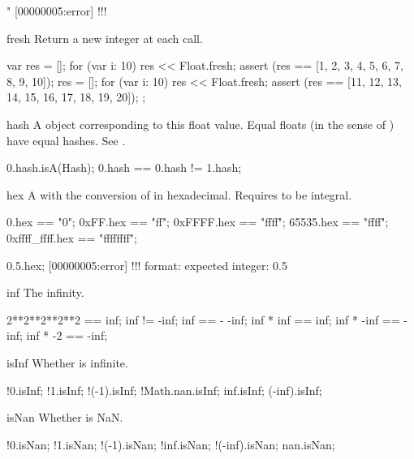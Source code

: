 \begin{urbiscriptapi}
\begin{urbiassert}
"%
[00000005:error] !!! %
\end{urbiassert}


\item[fresh]%
  Return a new integer at each call.
\begin{urbiscript}
{
  var res = [];
  for (var i: 10)
    res << Float.fresh;
  assert (res == [1, 2, 3, 4, 5, 6, 7, 8, 9, 10]);
  res = [];
  for (var i: 10)
    res << Float.fresh;
  assert (res == [11, 12, 13, 14, 15, 16, 17, 18, 19, 20]);
};
\end{urbiscript}


\item[hash] A  object corresponding to this float value.
  Equal floats (in the sense of ) have equal hashes.  See
  .

\begin{urbiassert}
0.hash.isA(Hash);
0.hash == 0.hash != 1.hash;
\end{urbiassert}



\item[hex] A  with the conversion of \this in hexadecimal.
  Requires \this to be integral.
\begin{urbiassert}
          0.hex == "0";
       0xFF.hex == "ff";
     0xFFFF.hex == "ffff";
      65535.hex == "ffff";
0xffff_ffff.hex == "ffffffff";

0.5.hex;
[00000005:error] !!! format: expected integer: 0.5
\end{urbiassert}


\item[inf]
  The infinity.
\begin{urbiassert}
2**2**2**2**2 == inf;
inf != -inf;
inf == - -inf;
inf * inf == inf;
inf * -inf == -inf;
inf * -2 == -inf;
\end{urbiassert}


\item[isInf]%
  Whether \this is infinite.
\begin{urbiassert}
    !0.isInf; !1.isInf; !(-1).isInf;
  !Math.nan.isInf;
   inf.isInf;  (-inf).isInf;
\end{urbiassert}


\item[isNan]%
  Whether is NaN.
\begin{urbiassert}
     !0.isNan; !1.isNan; !(-1).isNan;
   !inf.isNan;  !(-inf).isNan;
    nan.isNan;
\end{urbiassert}



\end{urbiscriptapi}
